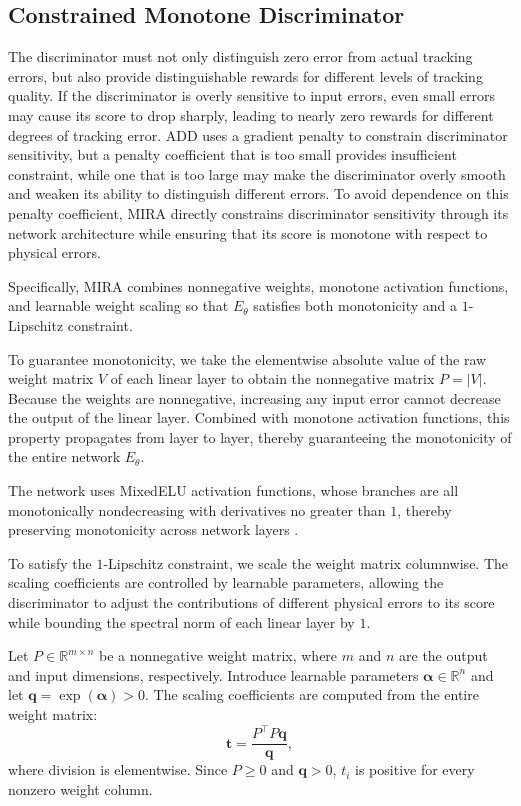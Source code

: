 \documentclass[letterpaper, 10pt, conference]{ieeeconf}
\begin{document}
\subsection{Constrained Monotone Discriminator}
\label{sec:critic}

The discriminator must not only distinguish zero error from actual
tracking errors, but also provide distinguishable rewards for different
levels of tracking quality. If the discriminator is overly sensitive to input
errors, even small errors may cause its score to drop sharply, leading
to nearly zero rewards for different degrees of tracking error. ADD uses
a gradient penalty to constrain discriminator sensitivity, but a penalty
coefficient that is too small provides insufficient constraint, while
one that is too large may make the discriminator overly smooth and
weaken its ability to distinguish different errors. To avoid dependence
on this penalty coefficient, MIRA directly constrains discriminator
sensitivity through its network architecture while ensuring that its
score is monotone with respect to physical errors.

Specifically, MIRA combines nonnegative weights, monotone activation
functions, and learnable weight scaling so that $E_\theta$ satisfies
both monotonicity and a $1$-Lipschitz constraint.

To guarantee monotonicity, we take the elementwise absolute value of the
raw weight matrix $V$ of each linear layer to obtain the nonnegative
matrix $P=|V|$. Because the weights are nonnegative, increasing any input
error cannot decrease the output of the linear layer. Combined with
monotone activation functions, this property propagates from layer to
layer, thereby guaranteeing the monotonicity of the entire network
$E_\theta$.

The network uses MixedELU activation functions, whose branches are all
monotonically nondecreasing with derivatives no greater than $1$,
thereby preserving monotonicity across network layers
\cite{runje2023constrained}.

To satisfy the $1$-Lipschitz constraint, we scale the weight matrix
columnwise. The scaling coefficients are controlled by learnable
parameters, allowing the discriminator to adjust the contributions of
different physical errors to its score while bounding the spectral norm
of each linear layer by $1$.

Let $P\in\mathbb R^{m\times n}$ be a nonnegative weight matrix, where
$m$ and $n$ are the output and input dimensions, respectively. Introduce
learnable parameters $\boldsymbol\alpha\in\mathbb R^n$ and let
$\mathbf q=\exp(\boldsymbol\alpha)>0$. The scaling coefficients are
computed from the entire weight matrix:
\begin{equation}
\mathbf t=\frac{P^\top P\mathbf q}{\mathbf q},
\label{eq:diagonal_coefficients}
\end{equation}
where division is elementwise. Since $P\geq0$ and $\mathbf q>0$,
$t_i$ is positive for every nonzero weight column.
\end{document}
